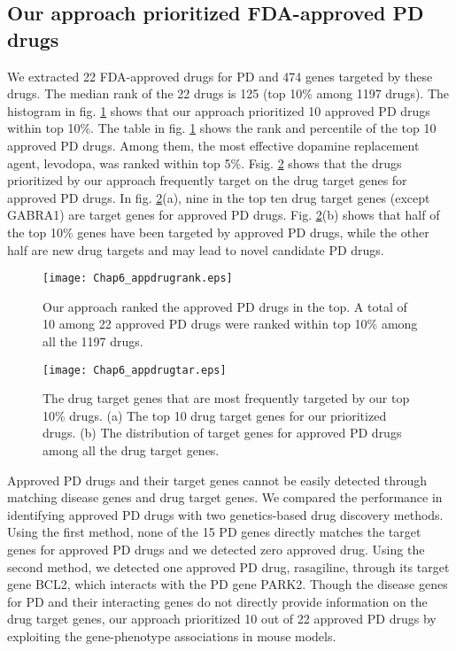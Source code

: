 \subsection{Our approach prioritized FDA-approved PD drugs}
We extracted 22 FDA-approved drugs for PD and 474 genes targeted by these drugs. The median rank of the 22 drugs is 125 (top 10\% among 1197 drugs). The histogram in fig. \ref{mphen_appdrug} shows that our approach prioritized 10 approved PD drugs within top 10\%. The table in fig. \ref{mphen_appdrug} shows the rank and percentile of the top 10 approved PD drugs. Among them, the most effective dopamine replacement agent, levodopa, was ranked within top 5\%. Fsig. \ref{mphen_appdrugtar} shows that the drugs prioritized by our approach frequently target on the drug target genes for approved PD drugs. In fig. \ref{mphen_appdrugtar}(a), nine in the top ten drug target genes (except GABRA1) are target genes for approved PD drugs. Fig. \ref{mphen_appdrugtar}(b) shows that half of the top 10\% genes have been targeted by approved PD drugs, while the other half are new drug targets and may lead to novel candidate PD drugs.
 \begin{figure}[h!]
  \begin{center}
\texttt{[image: Chap6\_appdrugrank.eps]}
\end{center}
  \caption{Our approach ranked the approved PD drugs in the top. A total of 10 among 22 approved PD drugs were ranked within top 10\% among all the 1197 drugs.}\label{mphen_appdrug}
  \end{figure}
   \begin{figure}[h!]
  \begin{center}
\texttt{[image: Chap6\_appdrugtar.eps]}
\end{center}
  \caption{The drug target genes that are most frequently targeted by our top 10\% drugs. (a) The top 10 drug target genes for our prioritized drugs. (b) The distribution of target genes for approved PD drugs among all the drug target genes.}\label{mphen_appdrugtar}
  \end{figure}

  Approved PD drugs and their target genes cannot be easily detected through matching disease genes and drug target genes. We compared the performance in identifying approved PD drugs with two genetics-based drug discovery methods. Using the first method, none of the 15 PD genes directly matches the target genes for approved PD drugs and we detected zero approved drug. Using the second method, we detected one approved PD drug, rasagiline, through its target gene BCL2, which interacts with the PD gene PARK2. Though the disease genes for PD and their interacting genes do not directly provide information on the drug target genes, our approach prioritized 10 out of 22 approved PD drugs by exploiting the gene-phenotype associations in mouse models.

